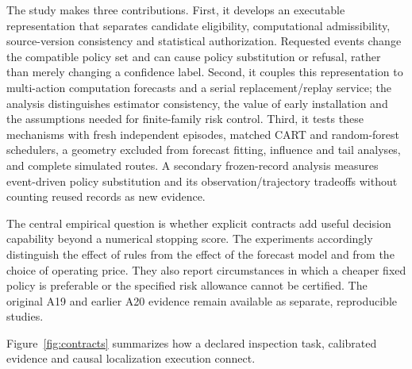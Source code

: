 The study makes three contributions. First, it develops an executable representation that separates candidate eligibility, computational admissibility, source-version consistency and statistical authorization. Requested events change the compatible policy set and can cause policy substitution or refusal, rather than merely changing a confidence label. Second, it couples this representation to multi-action computation forecasts and a serial replacement/replay service; the analysis distinguishes estimator consistency, the value of early installation and the assumptions needed for finite-family risk control. Third, it tests these mechanisms with fresh independent episodes, matched CART and random-forest schedulers, a geometry excluded from forecast fitting, influence and tail analyses, and complete simulated routes. A secondary frozen-record analysis measures event-driven policy substitution and its observation/trajectory tradeoffs without counting reused records as new evidence.

The central empirical question is whether explicit contracts add useful decision capability beyond a numerical stopping score. The experiments accordingly distinguish the effect of rules from the effect of the forecast model and from the choice of operating price. They also report circumstances in which a cheaper fixed policy is preferable or the specified risk allowance cannot be certified. The original A19 and earlier A20 evidence remain available as separate, reproducible studies.

Figure~\ref{fig:contracts} summarizes how a declared inspection task, calibrated evidence and causal localization execution connect.
